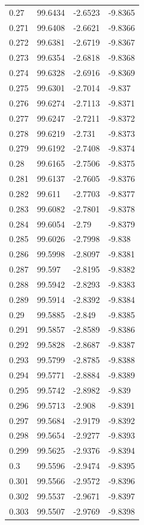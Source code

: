 \begin{tabular}{llll}
0.27 & 99.6434 & -2.6523 & -9.8365 \\
0.271 & 99.6408 & -2.6621 & -9.8366 \\
0.272 & 99.6381 & -2.6719 & -9.8367 \\
0.273 & 99.6354 & -2.6818 & -9.8368 \\
0.274 & 99.6328 & -2.6916 & -9.8369 \\
0.275 & 99.6301 & -2.7014 & -9.837 \\
0.276 & 99.6274 & -2.7113 & -9.8371 \\
0.277 & 99.6247 & -2.7211 & -9.8372 \\
0.278 & 99.6219 & -2.731 & -9.8373 \\
0.279 & 99.6192 & -2.7408 & -9.8374 \\
0.28 & 99.6165 & -2.7506 & -9.8375 \\
0.281 & 99.6137 & -2.7605 & -9.8376 \\
0.282 & 99.611 & -2.7703 & -9.8377 \\
0.283 & 99.6082 & -2.7801 & -9.8378 \\
0.284 & 99.6054 & -2.79 & -9.8379 \\
0.285 & 99.6026 & -2.7998 & -9.838 \\
0.286 & 99.5998 & -2.8097 & -9.8381 \\
0.287 & 99.597 & -2.8195 & -9.8382 \\
0.288 & 99.5942 & -2.8293 & -9.8383 \\
0.289 & 99.5914 & -2.8392 & -9.8384 \\
0.29 & 99.5885 & -2.849 & -9.8385 \\
0.291 & 99.5857 & -2.8589 & -9.8386 \\
0.292 & 99.5828 & -2.8687 & -9.8387 \\
0.293 & 99.5799 & -2.8785 & -9.8388 \\
0.294 & 99.5771 & -2.8884 & -9.8389 \\
0.295 & 99.5742 & -2.8982 & -9.839 \\
0.296 & 99.5713 & -2.908 & -9.8391 \\
0.297 & 99.5684 & -2.9179 & -9.8392 \\
0.298 & 99.5654 & -2.9277 & -9.8393 \\
0.299 & 99.5625 & -2.9376 & -9.8394 \\
0.3 & 99.5596 & -2.9474 & -9.8395 \\
0.301 & 99.5566 & -2.9572 & -9.8396 \\
0.302 & 99.5537 & -2.9671 & -9.8397 \\
0.303 & 99.5507 & -2.9769 & -9.8398 \\

\end{tabular}
